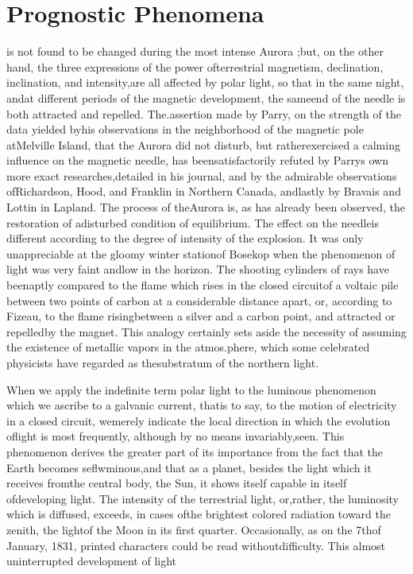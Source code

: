 
    \chapter{Prognostic Phenomena}
    is not found to be changed during the most intense Aurora ;but, on the other hand, the three expressions of the power ofterrestrial magnetism, declination, inclination, and intensity,are all affected by polar light, so that in the same night, andat different periods of the magnetic development, the sameend of the needle is both attracted and repelled. The.assertion made by Parry, on the strength of the data yielded byhis observations in the neighborhood of the magnetic pole atMelville Island, that the Aurora did not disturb, but ratherexercised a calming influence on the magnetic needle, has beensatisfactorily refuted by Parrys own more exact researches,detailed in his journal, and by the admirable observations ofRichardson, Hood, and Franklin in Northern Canada, andlastly by Bravais and Lottin in Lapland. The process of theAurora is, as has already been observed, the restoration of adisturbed condition of equilibrium. The effect on the needleis different according to the degree of intensity of the explosion. It was only unappreciable at the gloomy winter stationof Bosekop when the phenomenon of light was very faint andlow in the horizon. The shooting cylinders of rays have beenaptly compared to the flame which rises in the closed circuitof a voltaic pile between two points of carbon at a considerable distance apart, or, according to Fizeau, to the flame risingbetween a silver and a carbon point, and attracted or repelledby the magnet. This analogy certainly sets aside the necessity of assuming the existence of metallic vapors in the atmos.phere, which some celebrated physicists have regarded as thesubstratum of the northern light.

When we apply the indefinite term polar light to the luminous phenomenon which we ascribe to a galvanic current, thatis to say, to the motion of electricity in a closed circuit, wemerely indicate the local direction in which the evolution oflight is most frequently, although by no means invariably,seen. This phenomenon derives the greater part of its importance from the fact that the Earth becomes seflwminous,and that as a planet, besides the light which it receives fromthe central body, the Sun, it shows itself capable in itself ofdeveloping light. The intensity of the terrestrial light, or,rather, the luminosity which is diffused, exceeds, in cases ofthe brightest colored radiation toward the zenith, the lightof the Moon in its first quarter. Occasionally, as on the 7thof January, 1831, printed characters could be read withoutdifficulty. This almost uninterrupted development of light


